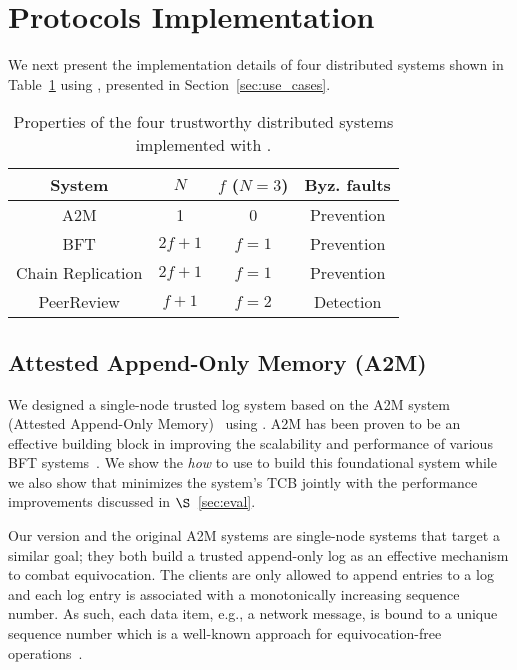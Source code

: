 \section{Protocols Implementation}\label{sec:use_cases-appendix}
We next present the implementation details of four distributed systems shown in Table~\ref{tab:use_cases_options} using \projecttitle{}, presented in Section~\ref{sec:use_cases}.

\begin{table}
\begin{center}
\small
\begin{tabular}{ |c|c|c|c| } 
 \hline
 System & $N$ & $f$ ($N=3$) & Byz. faults \\ [0.5ex] \hline \hline
 A2M    & 1 & 0 & Prevention\\
 BFT &  $2f+1$ & $f=1$ & Prevention\\
 Chain Replication &  $2f+1$ & $f=1$ & Prevention\\
 PeerReview & $f+1$ & $f=2$ & Detection\\
 \hline
\end{tabular}
\end{center}
\caption{Properties of the four trustworthy distributed systems implemented with \projecttitle{}.}
\label{tab:use_cases_options}
\end{table}

\subsection{Attested Append-Only Memory (A2M)}\label{sec:use_cases::a2m}





We designed a single-node trusted log system based on the A2M system (Attested Append-Only Memory)~\cite{A2M} using \projecttitle{}. A2M has been proven to be an effective building block in improving the scalability and performance of various BFT systems~\cite{sundr, Castro:2002, AbdElMalek2005FaultscalableBF}. We show the {\em how} to use \projecttitle{} to build this foundational system while we also show that \projecttitle{} minimizes the system's TCB jointly with the performance improvements discussed in $\S$~\ref{sec:eval}.

 Our \projecttitle{} version and the original A2M systems are single-node systems that target a similar goal; they both build a trusted append-only log as an effective mechanism to combat equivocation. The clients are only allowed to append entries to a log and each log entry is associated with a monotonically increasing sequence number. As such, each data item, e.g., a network message, is bound to a unique sequence number which is a well-known approach for equivocation-free operations~\cite{clement2012, hybster}. 

